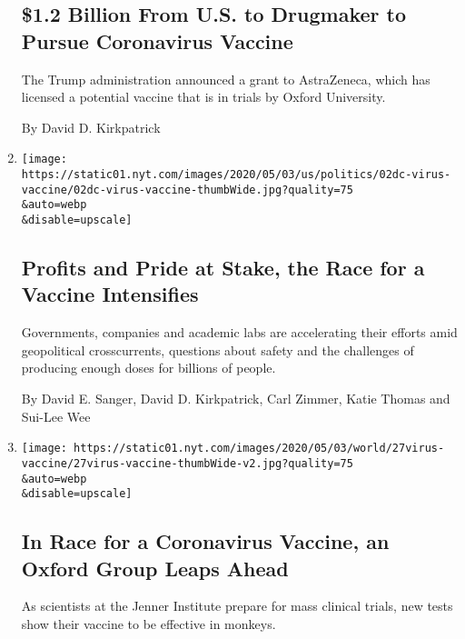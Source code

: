 \begin{enumerate}
  \hypertarget{12-billion-from-us-to-drugmaker-to-pursue-coronavirus-vaccine}{%
  \subsection{\$1.2 Billion From U.S. to Drugmaker to Pursue Coronavirus
  Vaccine}\label{12-billion-from-us-to-drugmaker-to-pursue-coronavirus-vaccine}}

  The Trump administration announced a grant to AstraZeneca, which has
  licensed a potential vaccine that is in trials by Oxford University.

  By David D. Kirkpatrick
\item
  \href{/2020/05/02/us/politics/vaccines-coronavirus-research.html}{}

  \texttt{[image: https://static01.nyt.com/images/2020/05/03/us/politics/02dc-virus-vaccine/02dc-virus-vaccine-thumbWide.jpg?quality=75\\\&auto=webp\\\&disable=upscale]}

  \hypertarget{profits-and-pride-at-stake-the-race-for-a-vaccine-intensifies}{%
  \subsection{Profits and Pride at Stake, the Race for a Vaccine
  Intensifies}\label{profits-and-pride-at-stake-the-race-for-a-vaccine-intensifies}}

  Governments, companies and academic labs are accelerating their
  efforts amid geopolitical crosscurrents, questions about safety and
  the challenges of producing enough doses for billions of people.

  By David E. Sanger, David D. Kirkpatrick, Carl Zimmer, Katie Thomas
  and Sui-Lee Wee
\item
  \href{/2020/04/27/world/europe/coronavirus-vaccine-update-oxford.html}{}

  \texttt{[image: https://static01.nyt.com/images/2020/05/03/world/27virus-vaccine/27virus-vaccine-thumbWide-v2.jpg?quality=75\\\&auto=webp\\\&disable=upscale]}

  \hypertarget{in-race-for-a-coronavirus-vaccine-an-oxford-group-leaps-ahead}{%
  \subsection{In Race for a Coronavirus Vaccine, an Oxford Group Leaps
  Ahead}\label{in-race-for-a-coronavirus-vaccine-an-oxford-group-leaps-ahead}}

  As scientists at the Jenner Institute prepare for mass clinical
  trials, new tests show their vaccine to be effective in monkeys.


\end{enumerate}
